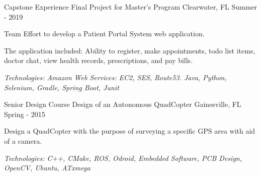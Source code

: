 

\begin{cventries}

	\cventry
		{Capstone Experience} %
		{Final Project for Master's Program} %
		{Clearwater, FL} %
		{Summer - 2019} %
		{
			\begin{cvitems} %
			\item {Team Effort to develop a Patient Portal System web application.}
			\item {The application included: Ability to register, make appointments, todo list items, doctor chat, view health records, prescriptions, and pay bills.}
      \item {\it{Technologies:} Amazon Web Services: EC2, SES, Route53. Java, Python, Selenium, Gradle, Spring Boot, Junit}
			\end{cvitems}
		}

  \cventry
    {Senior Design Course} %
    {Design of an Autonomous QuadCopter} %
    {Gainesville, FL} %
    {Spring - 2015} %
    {
      \begin{cvitems} %
				\item {Design a QuadCopter with the purpose of surveying a specific GPS area with aid of a camera.}
				\item {\it{Technologies:} C++, CMake, ROS, Odroid, Embedded Software, PCB Design, OpenCV, Ubuntu, ATxmega}
      \end{cvitems}
    }


\end{cventries}
